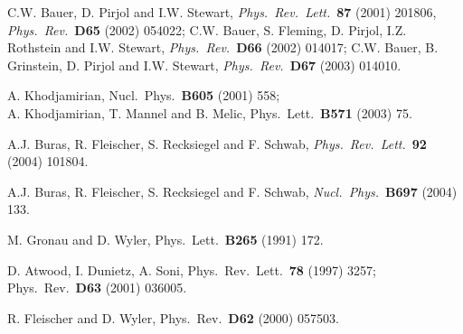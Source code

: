 \documentclass[11pt]{cernrep}
\begin{document}
\begin{thebibliography}{999}
C.W. Bauer, D. Pirjol and I.W. Stewart,
{\it Phys.\ Rev.\ Lett.}~{\bf 87} (2001) 201806,
{\it Phys.\ Rev.}~{\bf D65} (2002) 054022;
C.W. Bauer, S. Fleming, D. Pirjol, I.Z. Rothstein and I.W. Stewart,
{\it Phys.\ Rev.}~{\bf D66} (2002) 014017;
C.W. Bauer, B. Grinstein, D. Pirjol and I.W. Stewart,
{\it Phys.\ Rev.}~{\bf D67} (2003) 014010.

A. Khodjamirian,
{ Nucl.\ Phys.}~{\bf B605} (2001) 558;\\
A. Khodjamirian, T. Mannel and B. Melic,
{ Phys.\ Lett.}~{\bf B571} (2003) 75.


A.J. Buras, R. Fleischer, S. Recksiegel and F. Schwab,
{\it Phys.\ Rev.\ Lett.}~{\bf 92} (2004) 101804.

A.J. Buras, R. Fleischer, S. Recksiegel and F. Schwab,
  {\it Nucl.\ Phys.}~{\bf B697} (2004) 133.

M. Gronau and D. Wyler,
{ Phys.\ Lett.}~{\bf B265} (1991) 172.

D. Atwood, I. Dunietz, A. Soni,
{ Phys.\ Rev.\ Lett.}~{\bf 78} (1997) 3257;
{ Phys.\ Rev.}~{\bf D63} (2001) 036005.

R. Fleischer and D. Wyler,
{ Phys.\ Rev.}~{\bf D62} (2000) 057503.


\end{thebibliography}
\end{document}
